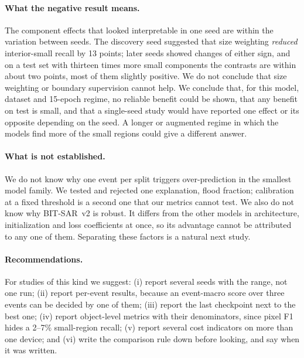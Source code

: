 \documentclass[runningheads]{llncs}
\begin{document}
\paragraph{What the negative result means.} The component effects that looked interpretable
in one seed are within the variation between seeds. The discovery seed suggested that size
weighting \emph{reduced} interior-small recall by 13 points; later seeds showed changes of
either sign, and on a test set with thirteen times more small components the contrasts are
within about two points, most of them slightly positive. We do not conclude that size
weighting or boundary supervision cannot help. We conclude that, for this model, dataset and
15-epoch regime, no reliable benefit could be shown, that any benefit on test is small, and
that a single-seed study would have reported one effect or its opposite depending on the
seed. A longer or augmented regime in which the models find more of the small regions could
give a different answer.

\paragraph{What is not established.} We do not know why one event per split triggers
over-prediction in the smallest model family. We tested and rejected one explanation, flood fraction; calibration at a fixed threshold is a
second one that our metrics cannot test. We also do not know why BIT-SAR~v2 is robust. It differs from the other models in
architecture, initialization and loss coefficients at once, so its advantage cannot be
attributed to any one of them. Separating these factors is a natural next study.

\paragraph{Recommendations.} For studies of this kind we suggest: (i) report several seeds
with the range, not one run; (ii) report per-event results, because an event-macro score
over three events can be decided by one of them; (iii) report the last checkpoint next to
the best one; (iv) report object-level metrics with their denominators, since pixel F1 hides
a 2--7\% small-region recall; (v) report several cost indicators on more than one device;
and (vi) write the comparison rule down before looking, and say when it was written.
\end{document}
